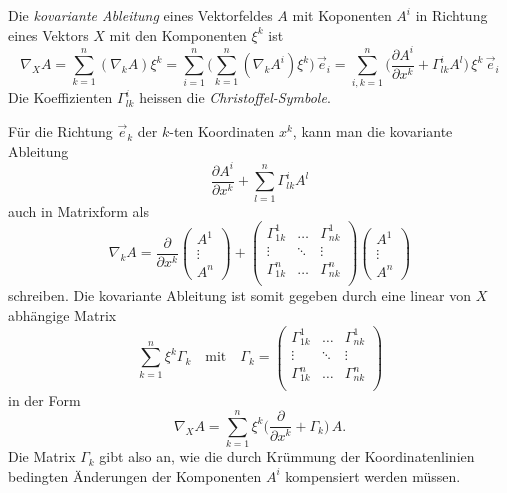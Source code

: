 \begin{definition}
\label{buch:zusammenhang:paralleltransport:kovabl:def:kovabl}
Die {\em kovariante Ableitung} eines Vektorfeldes $A$ mit Koponenten $A^i$
%
%
in Richtung eines Vektors $X$ mit den Komponenten $\xi^k$ ist
\begin{equation}
\nabla_X A
=
\sum_{k=1}^n
(\nabla_k A)
\xi^k
=
\sum_{i=1}^n
\biggl(
\sum_{k=1}^n
(
\nabla_k A^i
)
\xi^k
\biggr)
\,
\vec{e}_i
=
\sum_{i,k=1}^n
\biggl(
\frac{\partial A^i}{\partial x^k}
+
\Gamma^{i}_{lk} A^l
\biggr)
\,
\xi^k
\,
\vec{e}_i
\label{buch:zusammenhang:paralleltransport:eqn:koverianteableitung}
\end{equation}
Die Koeffizienten $\Gamma^i_{lk}$ heissen die {\em Christoffel-Symbole}.
%
\end{definition}

Für die Richtung $\vec{e}_k$ der $k$-ten Koordinaten $x^k$, kann man die
kovariante Ableitung
\[
\frac{\partial A^i}{\partial x^k}
+
\sum_{l=1}^n
\Gamma^i_{lk} A^l
\]
auch in Matrixform als
\[
\nabla_k A
=
\frac{\partial}{\partial x^k}
\begin{pmatrix}
A^1\\[-2pt]
\vdots\\
A^n
\end{pmatrix}
+
\begin{pmatrix}
\Gamma_{1k}^1 & \dots  & \Gamma^1_{nk} \\[-2pt]
\vdots        & \ddots & \vdots \\
\Gamma_{1k}^n & \dots  & \Gamma^n_{nk} \\
\end{pmatrix}
\begin{pmatrix}
A^1\\[-2pt]
\vdots\\
A^n
\end{pmatrix}
\]
schreiben.
Die kovariante Ableitung ist somit gegeben durch eine linear von $X$
abhängige Matrix 
\[
\sum_{k=1}^n \xi^k \Gamma_k
\quad
\text{mit}
\quad
\Gamma_k
=
\begin{pmatrix}
\Gamma_{1k}^1 & \dots  & \Gamma^1_{nk} \\[-2pt]
\vdots        & \ddots & \vdots \\
\Gamma_{1k}^n & \dots  & \Gamma^n_{nk} \\
\end{pmatrix}
\]
in der Form
\[
\nabla_X A
=
\sum_{k=1}^n
\xi^k
\biggl(
\frac{\partial}{\partial x^k}
+
\Gamma_k
\biggr)\, A.
\]
Die Matrix $\Gamma_k$ gibt also an, wie die durch Krümmung der
Koordinatenlinien bedingten Änderungen der Komponenten $A^i$ 
kompensiert werden müssen.

